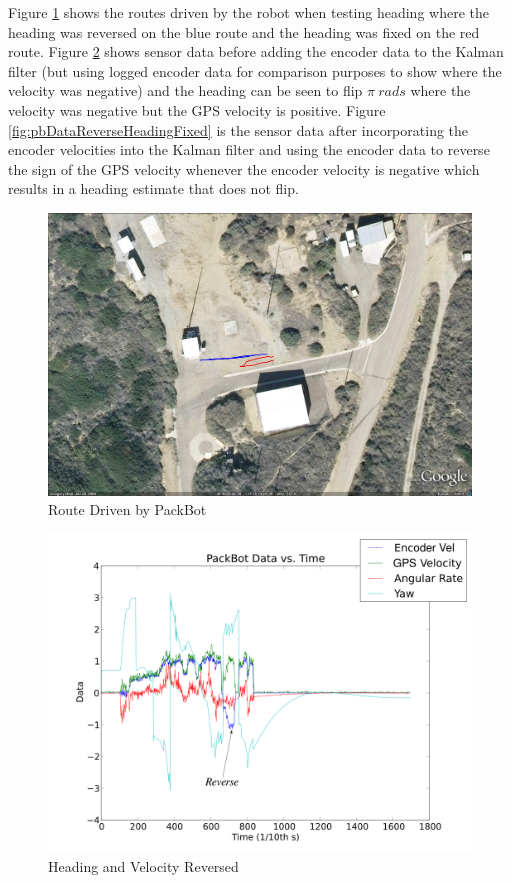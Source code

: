Figure \ref{fig:GEHeadingReverse} shows the routes driven by the robot when testing heading where the heading was reversed on the blue route and the heading was fixed on the red route. Figure \ref{fig:pbDataReverseHeadingBroken} shows sensor data before adding the encoder data to the Kalman filter (but using logged encoder data for comparison purposes to show where the velocity was negative) and the heading can be seen to flip $\pi ~ rads$ where the velocity was negative but the GPS velocity is positive. Figure \ref{fig:pbDataReverseHeadingFixed} is the sensor data after incorporating the encoder velocities into the Kalman filter and using the encoder data to reverse the sign of the GPS velocity whenever the encoder velocity is negative which results in a heading estimate that does not flip.

\begin{figure}[ht!]
	\centering
	\includegraphics[width=.7\textwidth]{images/GEHeadingReverseFixed}
	\caption{Route Driven by PackBot}
	\label{fig:GEHeadingReverse}
\end{figure}

\begin{figure}[ht!]
	\centering
	\includegraphics[width=.7\textwidth]{images/pbDataReverseHeading}
	\caption{Heading and Velocity Reversed}
	\label{fig:pbDataReverseHeadingBroken}
\end{figure}

